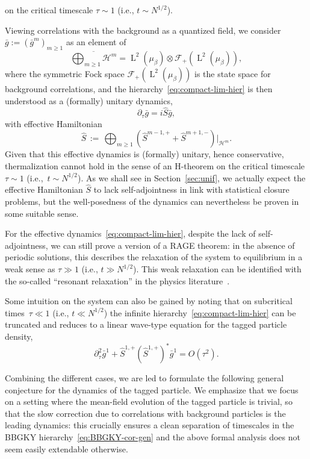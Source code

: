 \documentclass[a4paper,11pt,reqno,noindent]{amsart}
\theoremstyle{plain}
\numberwithin{equation}{section}
\newcommand{\Hc}{\mathcal H}
\newcommand{\3}{|\!|\!|}
\newcommand{\Ld}{\operatorname{L}}
\begin{document}
\begin{enumerate}[---]
on the critical timescale $\tau\sim1$ (i.e., $t\sim N^{1/2}$).
{Viewing correlations with the background as a quantized field, we consider $\bar g:=(\bar g^m)_{m\ge1}$ as an element of
\[\overline{\textstyle\bigoplus_{m\ge1}\Hc^m}=\Ld^2(\mu_\beta)\otimes\mathcal F_+(\Ld^2(\mu_\beta)),\]
where the symmetric Fock space $\mathcal F_+(\Ld^2(\mu_\beta))$ is the state space for background correlations,
and the hierarchy~\eqref{eq:compact-lim-hier} is then understood as a (formally) unitary dynamics,
\[\partial_\tau\bar g=i\hat S\bar g,\]
with effective Hamiltonian
\[\hat S\,:=\,\textstyle\bigoplus_{m\ge1}(\hat S^{m-1,+}+\hat S^{m+1,-})|_{\mathcal H^m}.\]
Given that this effective dynamics is (formally) unitary, hence conservative, thermalization cannot hold in the sense of an H-theorem on the critical timescale $\tau\sim1$ (i.e.,~$t\sim N^{1/2}$).
As we shall see in Section~\ref{sec:unif}, we actually expect the effective Hamiltonian $\hat S$ to lack self-adjointness in link with statistical closure problems, but the well-posedness of the dynamics can nevertheless be proven in some suitable sense.

For the effective dynamics~\eqref{eq:compact-lim-hier}, despite the lack of self-adjointness, we can still prove a version of a RAGE theorem: in the absence of periodic solutions, this describes the relaxation of the system to equilibrium in a weak sense as $\tau\gg1$ (i.e., $t\gg N^{1/2}$).
This weak relaxation can be identified with the so-called ``resonant relaxation'' in the physics literature~\cite{Rauch-Tremaine-96,Kocsis-Tremaine-15,Fouvry-BarOr-Chavanis-19,Magnan-Fouvry-Pichon-Chavanis-22}.}

Some intuition on the system can also be gained by noting that on {subcritical} times~\mbox{$\tau\ll1$} (i.e., $t\ll N^{1/2}$) the infinite hierarchy~\eqref{eq:compact-lim-hier} can be truncated and reduces to a linear wave-type equation for the tagged particle density,
\begin{equation}\label{eq:compact-wave}
\partial_\tau^2\bar g^1+\hat S^{1,+}(\hat S^{1,+})^*\bar g^1=O(\tau^2).
\end{equation}
\end{enumerate}

\smallskip\noindent
{Combining the different cases, we are led to formulate the following general conjecture for the dynamics of the tagged particle. We emphasize that we focus on a setting where the mean-field evolution of the tagged particle is trivial, so that the slow correction due to correlations with background particles is the leading dynamics: this crucially ensures a clean separation of timescales in the BBGKY hierarchy~\eqref{eq:BBGKY-cor-gen} and the above formal analysis does not seem easily extendable otherwise.
}
\end{document}
